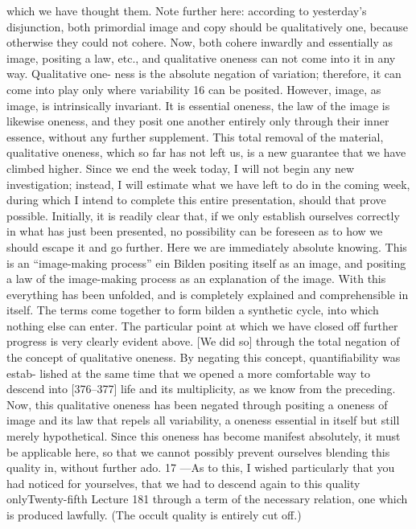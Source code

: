 which we have thought them.
Note further here: according to yesterday’s disjunction, both primordial
image and copy should be qualitatively one, because otherwise they could not
cohere. Now, both cohere inwardly and essentially as image, positing a law,
etc., and qualitative oneness can not come into it in any way. Qualitative one-
ness is the absolute negation of variation; therefore, it can come into play only
where variability 16 can be posited. However, image, as image, is intrinsically
invariant. It is essential oneness, the law of the image is likewise oneness, and
they posit one another entirely only through their inner essence, without any
further supplement. This total removal of the material, qualitative oneness,
which so far has not left us, is a new guarantee that we have climbed higher.
Since we end the week today, I will not begin any new investigation;
instead, I will estimate what we have left to do in the coming week, during
which I intend to complete this entire presentation, should that prove possible.
Initially, it is readily clear that, if we only establish ourselves correctly in
what has just been presented, no possibility can be foreseen as to how we
should escape it and go further. Here we are immediately absolute knowing.
This is an “image-making process” {ein Bilden} positing itself as an image, and
positing a law of the image-making process as an explanation of the image.
With this everything has been unfolded, and is completely explained and
comprehensible in itself. The terms come together to form {bilden} a synthetic
cycle, into which nothing else can enter.
The particular point at which we have closed off further progress is very
clearly evident above. [We did so] through the total negation of the concept
of qualitative oneness. By negating this concept, quantifiability was estab-
lished at the same time that we opened a more comfortable way to descend
into [376–377] life and its multiplicity, as we know from the preceding. Now,
this qualitative oneness has been negated through positing a oneness of image
and its law that repels all variability, a oneness essential in itself but still merely
hypothetical. Since this oneness has become manifest absolutely, it must be
applicable here, so that we cannot possibly prevent ourselves blending this
quality in, without further ado. 17 —As to this, I wished particularly that you
had noticed for yourselves, that we had to descend again to this quality onlyTwenty-fifth Lecture
181
through a term of the necessary relation, one which is produced lawfully. (The
occult quality is entirely cut off.)
